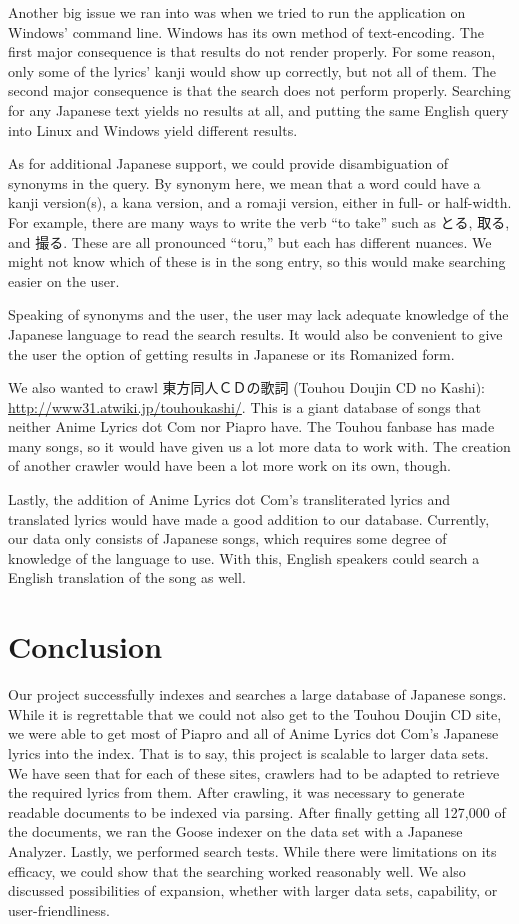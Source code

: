 \documentclass{acm} %
\begin{document}
\begin{CJK}{UTF8}{zhsong}
Another big issue we ran into was when we tried to run the application on Windows' command line. Windows has its own method of text-encoding. The first major consequence is that results do not render properly. For some reason, only some of the lyrics' kanji would show up correctly, but not all of them. The second major consequence is that the search does not perform properly. Searching for any Japanese text yields no results at all, and putting the same English query into Linux and Windows yield different results.

As for additional Japanese support, we could provide disambiguation of synonyms in the query. By synonym here, we mean that a word could have a kanji version(s), a kana version, and a romaji version, either in full- or half-width. For example, there are many ways to write the verb ``to take'' such as とる, 取る, and 撮る. These are all pronounced ``toru,'' but each has different nuances. We might not know which of these is in the song entry, so this would make searching easier on the user.

Speaking of synonyms and the user, the user may lack adequate knowledge of the Japanese language to read the search results. It would also be convenient to give the user the option of getting results in Japanese or its Romanized form.

We also wanted to crawl 東方同人ＣＤの歌詞 (Touhou Doujin CD no Kashi): \url{http://www31.atwiki.jp/touhoukashi/}. This is a giant database of songs that neither Anime Lyrics dot Com nor Piapro have. The Touhou fanbase has made many songs, so it would have given us a lot more data to work with. The creation of another crawler would have been a lot more work on its own, though.

Lastly, the addition of Anime Lyrics dot Com's transliterated lyrics and translated lyrics would have made a good addition to our database. Currently, our data only consists of Japanese songs, which requires some degree of knowledge of the language to use. With this, English speakers could search a English translation of the song as well.

\section{Conclusion}

Our project successfully indexes and searches a large database of Japanese songs. While it is regrettable that we could not also get to the Touhou Doujin CD site, we were able to get most of Piapro and all of Anime Lyrics dot Com's Japanese lyrics into the index. That is to say, this project is scalable to larger data sets. We have seen that for each of these sites, crawlers had to be adapted to retrieve the required lyrics from them. After crawling, it was necessary to generate readable documents to be indexed via parsing. After finally getting all 127,000 of the documents, we ran the Goose indexer on the data set with a Japanese Analyzer. Lastly, we performed search tests. While there were limitations on its efficacy, we could show that the searching worked reasonably well. We also discussed possibilities of expansion, whether with larger data sets, capability, or user-friendliness.


\end{CJK}
\end{document}
